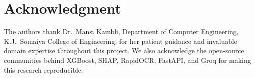 \documentclass[conference]{IEEEtran}
\begin{document}
\section*{Acknowledgment}

The authors thank Dr.\ Mansi Kambli, Department of
Computer Engineering, K.J.\ Somaiya College of
Engineering, for her patient guidance and invaluable
domain expertise throughout this project. We also
acknowledge the open-source communities behind
XGBoost, SHAP, RapidOCR, FastAPI, and Groq for
making this research reproducible.


\end{document}
